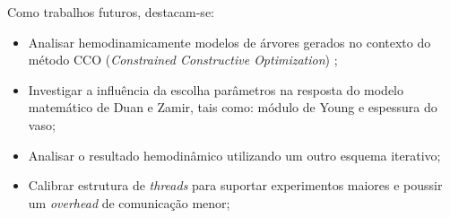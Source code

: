


Como trabalhos futuros, destacam-se:
\begin{itemize}
	\item Analisar hemodinamicamente modelos de árvores gerados no contexto do método CCO (\emph{Constrained Constructive Optimization}) \cite{Karch1999,Queiroz2013,Queiroz2015,Brito2017};
	\item Investigar a influência da escolha parâmetros na resposta do modelo matemático de Duan e Zamir, tais como: módulo de Young e espessura do vaso;
	\item Analisar o resultado hemodinâmico utilizando um outro esquema iterativo;
	\item Calibrar estrutura de \textit{threads} para suportar experimentos maiores e poussir um \textit{overhead} de comunicação menor;
\end{itemize}